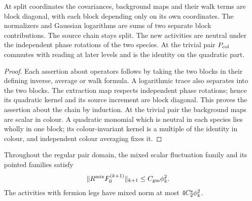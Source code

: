 \documentclass[11pt,letterpaper,reqno]{amsart}
\makeatletter
\theoremstyle{definition}
\newcommand{\ms@minorstart}{%
  \pushQED{\qed}\renewcommand{\qedsymbol}{$\blacksquare$}}
\newenvironment{lemma}[1][]{\ms@minorstart\ms@lemma[#1]}
  {\popQED\endms@lemma}
\theoremstyle{remark}
\makeatother
\begin{document}
\begin{lemma}\label{C-415-6}
At split coordinates the covariances, background maps and their
walk terms are block diagonal, with each block depending only
on its own coordinates.  The normalizers and Gaussian logarithms
are sums of two separate block contributions.  The source chain
stays split.  The new activities are neutral under the independent
phase rotations of the two species.  At the trivial pair
$P_{\rm col}$ commutes with reading at later levels and is the
identity on the quadratic part.
\end{lemma}

\begin{proof}
Each assertion about operators follows by taking the two blocks
in their defining inverse, average or walk formula.  A logarithmic
trace also separates into the two blocks.  The extraction map
respects independent phase rotations; hence its quadratic
kernel and its source increment are block diagonal.  This proves
the assertion about the chain by induction.  At the trivial pair
the background maps are scalar in colour.  A quadratic monomial
which is neutral in each species lies wholly in one block; its
colour-invariant kernel is a multiple of the identity in colour,
and independent colour averaging fixes it.
\end{proof}

\begin{lemma}\label{C-415-7}
Throughout the regular pair domain, the mixed scalar fluctuation
family and its pointed families satisfy
\[
 \|R^{\rm mix}F_0^{(k+1)}\|_{k+1}\le C_{\rm gm}\phi_k^2.
\]
The activities with fermion legs have mixed norm at most
$4C_2^{\rm s}\phi_k^2$.
\end{lemma}
\end{document}
